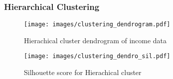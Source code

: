 
\subsubsection{Hierarchical Clustering}

\begin{figure}[H]
    \centering
    \texttt{[image: images/clustering\_dendrogram.pdf]} %
    \caption{Hierachical cluster dendrogram of income data}
    \label{fig:Hierachical cluster dendrogram of income data}
\end{figure}

\begin{figure}[H]
    \centering
    \texttt{[image: images/clustering\_dendro\_sil.pdf]} %
    \caption{Silhouette score for Hierachical cluster}
    \label{fig:Hierachical cluster silhouette score}
\end{figure}